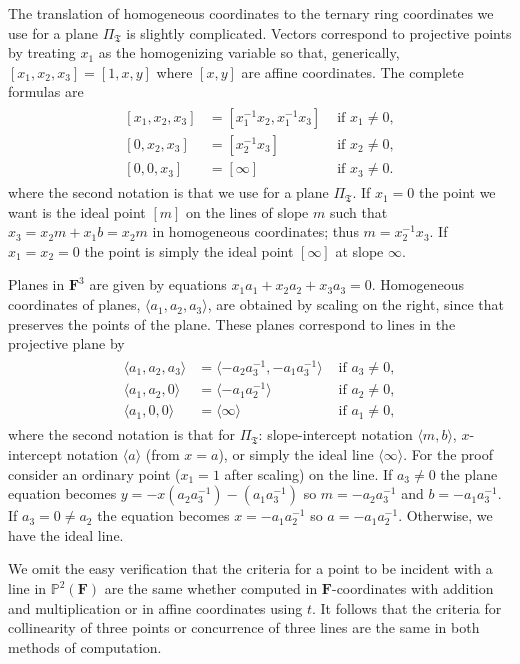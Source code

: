 \documentclass[reqno,12pt]{amsart}
\theoremstyle{remark}
\numberwithin{equation}{section}
\numberwithin{figure}{section}
\newcommand \inv{^{-1}}
\newcommand \bbP{\mathbb{P}}
\newcommand\fF{\mathbf{F}}	%
\newcommand \fT{\mathfrak T}
\newcommand \hz{[\infty]}
\newcommand \hZ{\langle\infty\rangle}
\newcommand\PP{\Pi}	%
\begin{document}
The translation of homogeneous coordinates to the ternary ring coordinates we use for a plane $\PP_\fT$ is slightly complicated.  Vectors correspond to projective points by treating $x_1$ as the homogenizing variable so that, generically, $[x_1,x_2,x_3] = [1,x,y]$ where $[x,y]$ are affine coordinates.  The complete formulas are
%
\begin{align}\label{E:pointsFT}
\begin{aligned}{}
[x_1,x_2,x_3] &= [x_1\inv x_2,x_1\inv x_3] &\text{ if } x_1\neq0, \\
[0,x_2,x_3] &= [x_2\inv x_3] &\text{ if } x_2\neq0,  \\
[0,0,x_3] &= \hz &\text{ if } x_3\neq0.
\end{aligned}
\end{align}
%
where the second notation is that we use for a plane $\PP_\fT$.  
If $x_1=0$ the point we want is the ideal point $[m]$ on the lines of slope $m$ such that $x_3=x_2m+x_1b=x_2m$ in homogeneous coordinates; thus $m=x_2\inv x_3$.  If $x_1=x_2=0$ the point is simply the ideal point $\hz$ at slope $\infty$.  

Planes in $\fF^3$ are given by equations $x_1a_1+x_2a_2+x_3a_3=0$.  Homogeneous coordinates of planes, $\langle a_1,a_2,a_3 \rangle$, are obtained by scaling on the right, since that preserves the points of the plane.  These planes correspond to lines in the projective plane by 
%
\begin{align}\label{E:linesFT}
\begin{aligned}
\langle a_1,a_2,a_3 \rangle &= \langle -a_2a_3\inv,-a_1a_3\inv \rangle &\text{ if } a_3\neq0, \\
\langle a_1,a_2,0 \rangle &= \langle -a_1a_2\inv \rangle &\text{ if } a_2\neq0,  \\
\langle a_1,0,0 \rangle &= \hZ &\text{ if } a_1\neq0,
\end{aligned}
\end{align}
%
where the second notation is that for $\PP_\fT$: slope-intercept notation $\langle m,b \rangle$, $x$-intercept notation $\langle a \rangle$ (from $x=a$), or simply the ideal line $\hZ$.  
For the proof consider an ordinary point ($x_1=1$ after scaling) on the line.  
If $a_3\neq0$ the plane equation becomes $y = -x(a_2a_3\inv) - (a_1a_3\inv)$ so $m=-a_2a_3\inv$ and $b=-a_1a_3\inv$.  
If $a_3=0\neq a_2$ the equation becomes $x = -a_1a_2\inv$ so $a = -a_1a_2\inv$.  
Otherwise, we have the ideal line.

We omit the easy verification that the criteria for a point to be incident with a line in $\bbP^2(\fF)$ are the same whether computed in $\fF$-coordinates with addition and multiplication or in affine coordinates using $t$.  
It follows that the criteria for collinearity of three points or concurrence of three lines are the same in both methods of computation.
\end{document}
